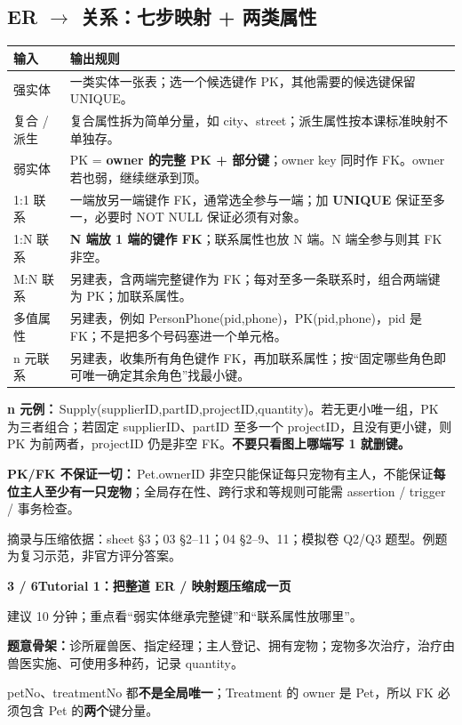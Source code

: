 \documentclass[11pt,a4paper]{article}
\newcommand{\stitle}[2]{{\sffamily\LARGE\bfseries\color{CUHKPurple}#1}\par{\small\color{Muted}#2}\par\vspace{3mm}}
\newcommand{\src}[1]{\par\vfill{\footnotesize\color{Muted}摘录与压缩依据：#1。例题为复习示范，非官方评分答案。}}
\begin{document}
\subsection{ER $\to$ 关系：七步映射 + 两类属性}
\begin{tabularx}{\linewidth}{@{}p{2.2cm}X@{}}
\toprule 输入 & 输出规则 \\
\midrule
强实体 & 一类实体一张表；选一个候选键作 PK，其他需要的候选键保留 UNIQUE。\\
复合 / 派生 & 复合属性拆为简单分量，如 city、street；派生属性按本课标准映射不单独存。\\
弱实体 & PK = \textbf{owner 的完整 PK + 部分键}；owner key 同时作 FK。owner 若也弱，继续继承到顶。\\
1:1 联系 & 一端放另一端键作 FK，通常选全参与一端；加 \textbf{UNIQUE} 保证至多一，必要时 NOT NULL 保证必须有对象。\\
1:N 联系 & \textbf{N 端放 1 端的键作 FK}；联系属性也放 N 端。N 端全参与则其 FK 非空。\\
M:N 联系 & 另建表，含两端完整键作为 FK；每对至多一条联系时，组合两端键为 PK；加联系属性。\\
多值属性 & 另建表，例如 PersonPhone(pid,phone)，PK(pid,phone)，pid 是 FK；不是把多个号码塞进一个单元格。\\
n 元联系 & 另建表，收集所有角色键作 FK，再加联系属性；按“固定哪些角色即可唯一确定其余角色”找最小键。\\
\bottomrule
\end{tabularx}
\textbf{n 元例：}\,Supply(supplierID,partID,projectID,quantity)。若无更小唯一组，PK 为三者组合；若固定 supplierID、partID 至多一个 projectID，且没有更小键，则 PK 为前两者，projectID 仍是非空 FK。\textbf{不要只看图上哪端写 1 就删键。}\par
\textbf{PK/FK 不保证一切：}\,Pet.ownerID 非空只能保证每只宠物有主人，不能保证\textbf{每位主人至少有一只宠物}；全局存在性、跨行求和等规则可能需 assertion / trigger / 事务检查。
\src{sheet §3；03 §2--11；04 §2--9、11；模拟卷 Q2/Q3 题型}

\clearpage
\stitle{3 / 6\quad Tutorial 1：把整道 ER / 映射题压缩成一页}{建议 10 分钟；重点看“弱实体继承完整键”和“联系属性放哪里”。}
\textbf{题意骨架：}诊所雇兽医、指定经理；主人登记、拥有宠物；宠物多次治疗，治疗由兽医实施、可使用多种药，记录 quantity。

\begin{center}\end{center}
petNo、treatmentNo 都\textbf{不是全局唯一}；Treatment 的 owner 是 Pet，所以 FK 必须包含 Pet 的\textbf{两个}键分量。
\end{document}
